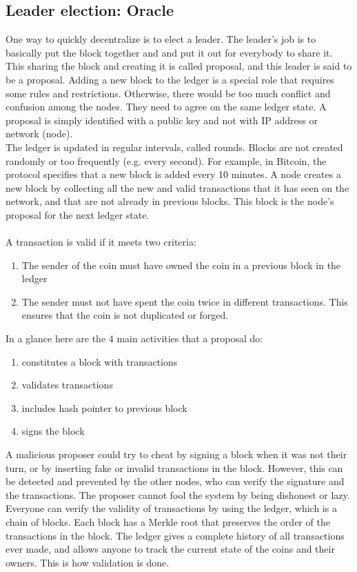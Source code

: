 \documentclass{report}
\begin{document}
\subsection{Leader election: Oracle}
One way to quickly decentralize is to elect a leader. The leader's job is to basically put the block together and and put it out for everybody to share it. This sharing the block and creating it is called proposal, and this leader is said to be a proposal. Adding a new block to the ledger is a special role that requires some rules and restrictions. Otherwise, there would be too much conflict and confusion among the nodes. They need to agree on the same ledger state. A proposal is simply identified with a public key and not with IP address or network (node).\\
The ledger is updated in regular intervals, called rounds. Blocks are not created randomly or too frequently (e.g. every second). For example, in Bitcoin, the protocol specifies that a new block is added every 10 minutes. A node creates a new block by collecting all the new and valid transactions that it has seen on the network, and that are not already in previous blocks. This block is the node’s proposal for the next ledger state.\\\\
A transaction is valid if it meets two criteria:
\begin{enumerate}
	\item The sender of the coin must have owned the coin in a previous block in the ledger
	\item The sender must not have spent the coin twice in different transactions. This ensures that the coin is not duplicated or forged.
\end{enumerate}
In a glance here are the 4 main activities that a proposal do:
\begin{enumerate}
	\item constitutes a block with transactions
	\item validates transactions
	\item includes hash pointer to previous block
	\item signs the block
\end{enumerate}
A malicious proposer could try to cheat by signing a block when it was not their turn, or by inserting fake or invalid transactions in the block. However, this can be detected and prevented by the other nodes, who can verify the signature and the transactions. The proposer cannot fool the system by being dishonest or lazy. Everyone can verify the validity of transactions by using the ledger, which is a chain of blocks. Each block has a Merkle root that preserves the order of the transactions in the block. The ledger gives a complete history of all transactions ever made, and allows anyone to track the current state of the coins and their owners. This is how validation is done.\\\\
\end{document}
